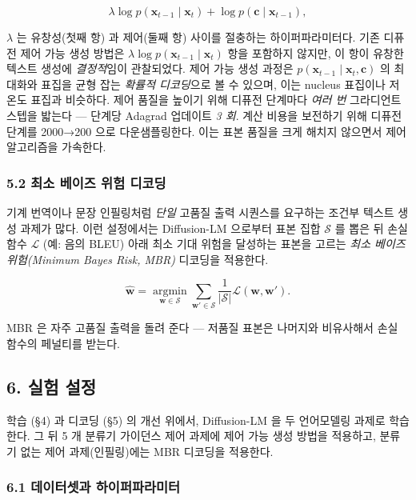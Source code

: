 \documentclass[
]{article}
\begin{document}
\[
\lambda \log p(\mathbf{x}_{t-1} \mid \mathbf{x}_t) + \log p(\mathbf{c} \mid \mathbf{x}_{t-1}),
\]

\(\lambda\) 는 유창성(첫째 항) 과 제어(둘째 항) 사이를 절충하는
하이퍼파라미터다. 기존 디퓨전 제어 가능 생성 방법은
\(\lambda \log p(\mathbf{x}_{t-1} \mid \mathbf{x}_t)\) 항을 포함하지
않지만, 이 항이 유창한 텍스트 생성에 \emph{결정적}임이 관찰되었다. 제어
가능 생성 과정은 \(p(\mathbf{x}_{t-1} \mid \mathbf{x}_t, \mathbf{c})\)
의 최대화와 표집을 균형 잡는 \emph{확률적 디코딩}으로 볼 수 있으며, 이는
nucleus 표집이나 저온도 표집과 비슷하다. 제어 품질을 높이기 위해 디퓨전
단계마다 \emph{여러 번} 그라디언트 스텝을 밟는다 --- 단계당 Adagrad
업데이트 \emph{3 회}. 계산 비용을 보전하기 위해 디퓨전 단계를 2000→200
으로 다운샘플링한다. 이는 표본 품질을 크게 해치지 않으면서 제어
알고리즘을 가속한다.

\hypertarget{uxcd5cuxc18c-uxbca0uxc774uxc988-uxc704uxd5d8-uxb514uxcf54uxb529}{%
\subsubsection{5.2 최소 베이즈 위험
디코딩}\label{uxcd5cuxc18c-uxbca0uxc774uxc988-uxc704uxd5d8-uxb514uxcf54uxb529}}

기계 번역이나 문장 인필링처럼 \emph{단일} 고품질 출력 시퀀스를 요구하는
조건부 텍스트 생성 과제가 많다. 이런 설정에서는 Diffusion-LM 으로부터
표본 집합 \(\mathcal{S}\) 를 뽑은 뒤 손실 함수 \(\mathcal{L}\) (예: 음의
BLEU) 아래 최소 기대 위험을 달성하는 표본을 고르는 \emph{최소 베이즈
위험(Minimum Bayes Risk, MBR)} 디코딩을 적용한다.

\[
\hat{\mathbf{w}} = \operatorname*{argmin}_{\mathbf{w} \in \mathcal{S}} \sum_{\mathbf{w}' \in \mathcal{S}} \frac{1}{|\mathcal{S}|} \mathcal{L}(\mathbf{w}, \mathbf{w}').
\]

MBR 은 자주 고품질 출력을 돌려 준다 --- 저품질 표본은 나머지와
비유사해서 손실 함수의 페널티를 받는다.

\hypertarget{uxc2e4uxd5d8-uxc124uxc815}{%
\subsection{6. 실험 설정}\label{uxc2e4uxd5d8-uxc124uxc815}}

학습 (§4) 과 디코딩 (§5) 의 개선 위에서, Diffusion-LM 을 두 언어모델링
과제로 학습한다. 그 뒤 5 개 분류기 가이던스 제어 과제에 제어 가능 생성
방법을 적용하고, 분류기 없는 제어 과제(인필링)에는 MBR 디코딩을
적용한다.

\hypertarget{uxb370uxc774uxd130uxc14buxacfc-uxd558uxc774uxd37cuxd30cuxb77cuxbbf8uxd130}{%
\subsubsection{6.1 데이터셋과
하이퍼파라미터}\label{uxb370uxc774uxd130uxc14buxacfc-uxd558uxc774uxd37cuxd30cuxb77cuxbbf8uxd130}}
\end{document}
